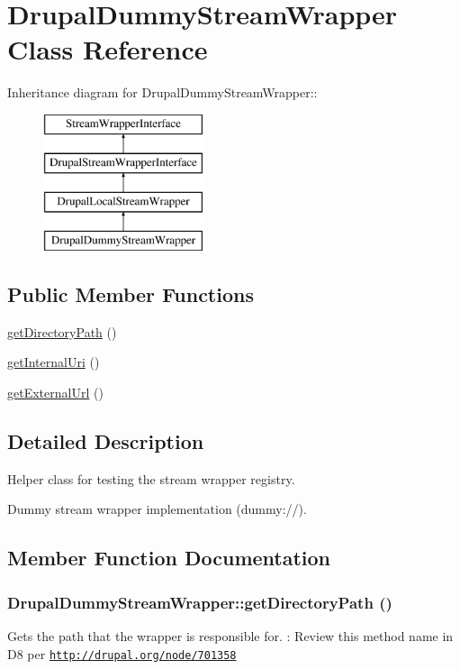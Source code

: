 \hypertarget{classDrupalDummyStreamWrapper}{
\section{DrupalDummyStreamWrapper Class Reference}
\label{classDrupalDummyStreamWrapper}
}
Inheritance diagram for DrupalDummyStreamWrapper::\begin{figure}[H]
\begin{center}
\leavevmode
\includegraphics[height=4cm]{classDrupalDummyStreamWrapper}
\end{center}
\end{figure}
\subsection*{Public Member Functions}
\begin{DoxyCompactItemize}
\item 
\hyperlink{classDrupalDummyStreamWrapper_a4164ffaf51482dfe9961c5af19bbcb8c}{getDirectoryPath} ()
\item 
\hyperlink{classDrupalDummyStreamWrapper_a7030782108cc094b3d8922d414b37f98}{getInternalUri} ()
\item 
\hyperlink{classDrupalDummyStreamWrapper_a0ab51a9f3ec32db594a32ef4083ae6db}{getExternalUrl} ()
\end{DoxyCompactItemize}


\subsection{Detailed Description}
Helper class for testing the stream wrapper registry.

Dummy stream wrapper implementation (dummy://). 

\subsection{Member Function Documentation}
\hypertarget{classDrupalDummyStreamWrapper_a4164ffaf51482dfe9961c5af19bbcb8c}{
\subsubsection[{getDirectoryPath}]{\setlength{\rightskip}{0pt plus 5cm}DrupalDummyStreamWrapper::getDirectoryPath ()}}
\label{classDrupalDummyStreamWrapper_a4164ffaf51482dfe9961c5af19bbcb8c}
Gets the path that the wrapper is responsible for. : Review this method name in D8 per \href{http://drupal.org/node/701358}{\tt http://drupal.org/node/701358}

